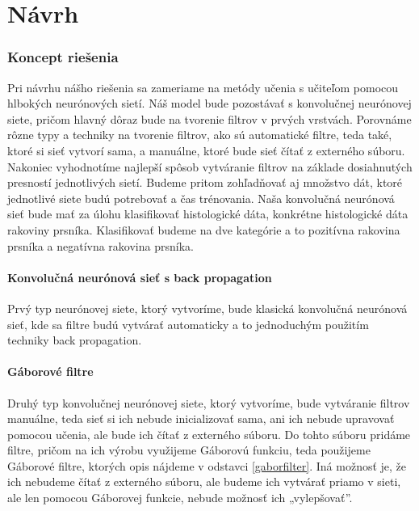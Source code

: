 \chapter{Návrh}

\subsection{Koncept riešenia}

\hspace{10mm}Pri návrhu nášho riešenia sa zameriame na metódy učenia s učiteľom pomocou hlbokých neurónových sietí. Náš model bude pozostávať s konvolučnej neurónovej siete, pričom hlavný dôraz bude na tvorenie filtrov v prvých vrstvách. Porovnáme rôzne typy a techniky na tvorenie filtrov, ako sú automatické filtre, teda také, ktoré si sieť vytvorí sama, a manuálne, ktoré bude sieť čítať z externého súboru. Nakoniec vyhodnotíme najlepší spôsob vytváranie filtrov na základe dosiahnutých presností jednotlivých sietí. Budeme pritom zohľadňovať aj množstvo dát, ktoré jednotlivé siete budú potrebovať a čas trénovania. Naša konvolučná neurónová sieť bude mať za úlohu klasifikovať histologické dáta, konkrétne histologické dáta rakoviny prsníka. Klasifikovať budeme na dve kategórie a to pozitívna rakovina prsníka a negatívna rakovina prsníka. 

\subsubsection*{Konvolučná neurónová sieť s back propagation}
\hspace{10mm}Prvý typ neurónovej siete, ktorý vytvoríme, bude klasická konvolučná neurónová sieť, kde sa filtre budú vytvárať automaticky a to jednoduchým použitím techniky back propagation. 

\subsubsection*{Gáborové filtre}
\hspace{10mm}Druhý typ konvolučnej neurónovej siete, ktorý vytvoríme, bude vytváranie filtrov manuálne, teda sieť si ich nebude inicializovať sama,  ani ich nebude upravovať pomocou učenia, ale bude ich čítať z externého súboru. Do tohto súboru pridáme filtre, pričom na ich výrobu využijeme Gáborovú funkciu, teda použijeme Gáborové filtre, ktorých opis nájdeme v odstavci \ref{gaborfilter}. Iná možnosť je, že ich nebudeme čítať z externého súboru, ale budeme ich vytvárať priamo v sieti, ale len pomocou Gáborovej funkcie, nebude možnosť ich „vylepšovať”.

